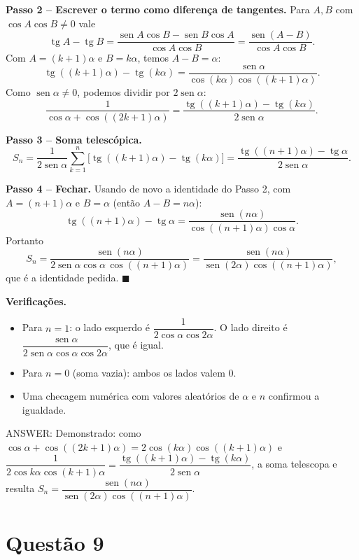 \documentclass{article}%
\begin{document}
\textbf{Passo 2 -- Escrever o termo como diferença de tangentes.} Para $A,B$ com $\cos A\cos B\neq0$ vale
\[
\operatorname{tg}A-\operatorname{tg}B=\frac{\operatorname{sen}A\cos B-\operatorname{sen}B\cos A}{\cos A\cos B}=\frac{\operatorname{sen}(A-B)}{\cos A\cos B}.
\]
Com $A=(k+1)\alpha$ e $B=k\alpha$, temos $A-B=\alpha$:
\[
\operatorname{tg}((k+1)\alpha)-\operatorname{tg}(k\alpha)=\frac{\operatorname{sen}\alpha}{\cos(k\alpha)\cos((k+1)\alpha)} .
\]
Como $\operatorname{sen}\alpha\ne0$, podemos dividir por $2\operatorname{sen}\alpha$:
\[
\frac{1}{\cos\alpha+\cos((2k+1)\alpha)}=\frac{\operatorname{tg}((k+1)\alpha)-\operatorname{tg}(k\alpha)}{2\operatorname{sen}\alpha}.
\]

\textbf{Passo 3 -- Soma telescópica.}
\[
S_n=\frac{1}{2\operatorname{sen}\alpha}\sum_{k=1}^{n}\Big[\operatorname{tg}((k+1)\alpha)-\operatorname{tg}(k\alpha)\Big]=\frac{\operatorname{tg}((n+1)\alpha)-\operatorname{tg}\alpha}{2\operatorname{sen}\alpha}.
\]

\textbf{Passo 4 -- Fechar.} Usando de novo a identidade do Passo 2, com $A=(n+1)\alpha$ e $B=\alpha$ (então $A-B=n\alpha$):
\[
\operatorname{tg}((n+1)\alpha)-\operatorname{tg}\alpha=\frac{\operatorname{sen}(n\alpha)}{\cos((n+1)\alpha)\cos\alpha}.
\]
Portanto
\[
S_n=\frac{\operatorname{sen}(n\alpha)}{2\operatorname{sen}\alpha\cos\alpha\,\cos((n+1)\alpha)}=\frac{\operatorname{sen}(n\alpha)}{\operatorname{sen}(2\alpha)\cos((n+1)\alpha)},
\]
que é a identidade pedida. $\blacksquare$

\textbf{Verificações.}
\begin{itemize}
\item Para $n=1$: o lado esquerdo é $\dfrac{1}{2\cos\alpha\cos2\alpha}$. O lado direito é $\dfrac{\operatorname{sen}\alpha}{2\operatorname{sen}\alpha\cos\alpha\cos2\alpha}$, que é igual.
\item Para $n=0$ (soma vazia): ambos os lados valem $0$.
\item Uma checagem numérica com valores aleatórios de $\alpha$ e $n$ confirmou a igualdade.
\end{itemize}

ANSWER: Demonstrado: como $\cos\alpha+\cos((2k+1)\alpha)=2\cos(k\alpha)\cos((k+1)\alpha)$ e $\dfrac{1}{2\cos k\alpha\cos (k+1)\alpha}=\dfrac{\operatorname{tg}((k+1)\alpha)-\operatorname{tg}(k\alpha)}{2\operatorname{sen}\alpha}$, a soma telescopa e resulta $S_n=\dfrac{\operatorname{sen}(n\alpha)}{\operatorname{sen}(2\alpha)\cos((n+1)\alpha)}$.%
\newpage%
\section*{Questão 9}
\end{document}
